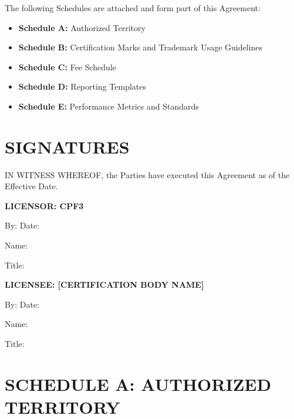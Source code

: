 \documentclass[11pt,a4paper]{article}
\begin{document}
The following Schedules are attached and form part of this Agreement:

\begin{itemize}
\item \textbf{Schedule A:} Authorized Territory
\item \textbf{Schedule B:} Certification Marks and Trademark Usage Guidelines
\item \textbf{Schedule C:} Fee Schedule
\item \textbf{Schedule D:} Reporting Templates
\item \textbf{Schedule E:} Performance Metrics and Standards
\end{itemize}

\vspace{2em}

\section*{SIGNATURES}

IN WITNESS WHEREOF, the Parties have executed this Agreement as of the Effective Date.

\vspace{2em}

\textbf{LICENSOR: CPF3}

\vspace{1.5em}

By: \underline{\hspace{6cm}} Date: \underline{\hspace{3cm}}

Name: \underline{\hspace{6cm}}

Title: \underline{\hspace{6cm}}

\vspace{2em}

\textbf{LICENSEE: [CERTIFICATION BODY NAME]}

\vspace{1.5em}

By: \underline{\hspace{6cm}} Date: \underline{\hspace{3cm}}

Name: \underline{\hspace{6cm}}

Title: \underline{\hspace{6cm}}

\newpage

\section*{SCHEDULE A: AUTHORIZED TERRITORY}
\end{document}
